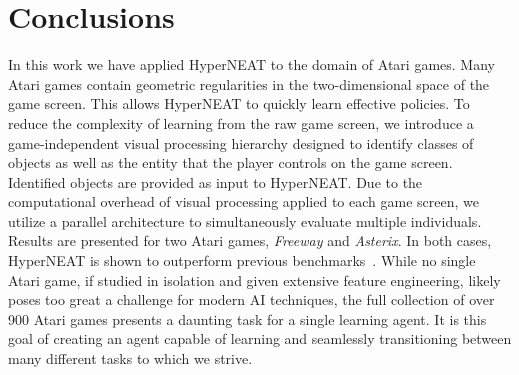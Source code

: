 \documentclass{acm_proc_article-sp}
\begin{document}
\section{Conclusions}
\label{sec:conclusion}
In this work we have applied HyperNEAT to the domain of Atari games. Many Atari games contain geometric regularities in the two-dimensional space of the game screen. This allows HyperNEAT to quickly learn effective policies. To reduce the complexity of learning from the raw game screen, we introduce a game-independent visual processing hierarchy designed to identify classes of objects as well as the entity that the player controls on the game screen. Identified objects are provided as input to HyperNEAT. Due to the computational overhead of visual processing applied to each game screen, we utilize a parallel architecture to simultaneously evaluate multiple individuals. Results are presented for two Atari games, \textit{Freeway} and \textit{Asterix}. In both cases, HyperNEAT is shown to outperform previous benchmarks~\cite{naddaf10}. While no single Atari game, if studied in isolation and given extensive feature engineering, likely poses too great a challenge for modern AI techniques, the full collection of over 900 Atari games presents a daunting task for a single learning agent. It is this goal of creating an agent capable of learning and seamlessly transitioning between many different tasks to which we strive.



%

\end{document}
